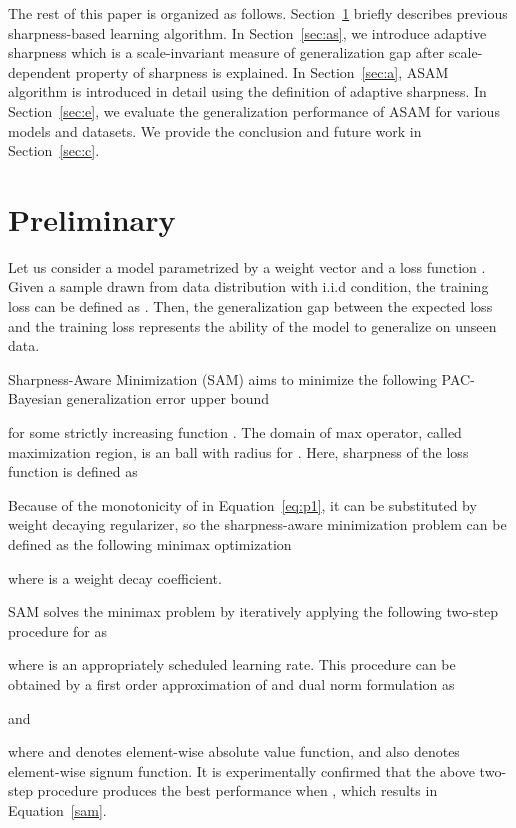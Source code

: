 \documentclass{article}
\begin{document}
The rest of this paper is organized as follows. Section~\ref{sec:p} briefly describes previous sharpness-based learning algorithm. In Section~\ref{sec:as}, we introduce adaptive sharpness which is a scale-invariant measure of generalization gap after scale-dependent property of sharpness is explained. In Section~\ref{sec:a}, ASAM algorithm is introduced in detail using the definition of adaptive sharpness.
In Section~\ref{sec:e}, we evaluate the generalization performance of ASAM for various models and datasets.
We provide the conclusion and future work in Section~\ref{sec:c}.




\section{Preliminary} \label{sec:p}
Let us consider a model  parametrized by a weight vector  and a loss function .
Given a sample  drawn from data distribution  with i.i.d condition, the training loss can be defined as .
Then, the generalization gap between the expected loss  and the training loss  represents the ability of the model to generalize on unseen data.

Sharpness-Aware Minimization (SAM) \citep{foret2021sharpnessaware} aims to minimize the following PAC-Bayesian generalization error upper bound


for some strictly increasing function .
The domain of max operator, called maximization region, is an  ball with radius  for .
Here, sharpness of the loss function  is defined as

Because of the monotonicity of  in Equation~\ref{eq:p1}, it can be substituted by  weight decaying regularizer, so the sharpness-aware minimization problem can be defined as the following minimax optimization

\noindent where  is a weight decay coefficient.

SAM solves the minimax problem by iteratively applying the following two-step procedure for  as

where  is an appropriately scheduled learning rate. This procedure can be obtained by a first order approximation of  and dual norm formulation as

and

where  and  denotes element-wise absolute value function, and  also denotes element-wise signum function.
It is experimentally confirmed that the above two-step procedure produces the best performance when , which results in Equation~\ref{sam}.
\end{document}
